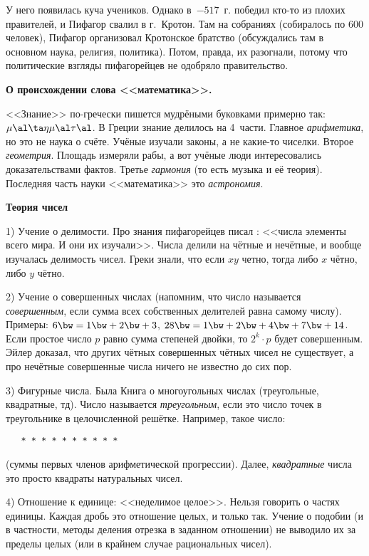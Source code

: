 \documentclass[a4paper,oneside,fleqn,10pt]{article}
\begin{document}
У него появилась куча учеников. Однако в~$-517$~г. победил кто-то из
плохих правителей, и Пифагор свалил в г.~Кротон. Там на собраниях
(собиралось по 600 человек), Пифагор организовал Кротонское братство
(обсуждались там в основном наука, религия, политика). Потом, правда,
их разогнали, потому что политические взгляды пифагорейцев не одобряло
правительство.

\textbf{О происхождении слова <<математика>>.}

<<Знание>> по-гречески пишется мудрёными буковками примерно так:
$\mu\al\ta\eta\mu\al\tau\al$.  В Греции знание делилось на
4~части. Главное \emph{арифметика}, но это не наука о счёте.  Учёные
изучали законы, а не какие-то чиселки. Второе \emph{геометрия}.
Площадь измеряли рабы, а вот учёные люди интересовались
доказательствами фактов.  Третье \emph{гармония} (то есть музыка и её
теория).  Последняя часть науки <<математика>> это \emph{астрономия}.

\textbf{Теория чисел}

1) Учение о делимости. Про знания пифагорейцев писал
: <<числа элементы всего мира. И они их изучали>>.
Числа делили на чётные и нечётные, и вообще изучалась делимость чисел.
Греки знали, что если $xy$ четно, тогда либо $x$ чётно, либо $y$
чётно.

2) Учение о совершенных числах (напомним, что число называется
\emph{совершенным}, если сумма всех собственных делителей равна самому
числу).  Примеры: $6 \bw= 1 \bw+ 2 \bw+ 3$, $28 \bw= 1 \bw+ 2 \bw+ 4
\bw+ 7 \bw+ 14$.  Если простое число $p$ равно сумма степеней двойки,
то $2^k \cdot p$ будет совершенным. 
Эйлер доказал, что других чётных совершенных чётных чисел не
существует, а про нечётные совершенные числа ничего не известно до сих
пор.

3) Фигурные числа. Была Книга о многоугольных числах (треугольные,
квадратные, тд).  Число называется \emph{треугольным}, если это число
точек в треугольнике в целочисленной решётке.  Например, такое число:
\begin{verbatim}
   * * * * * * * * * *
\end{verbatim}
(суммы первых членов арифметической прогрессии).  Далее,
\emph{квадратные} числа это просто квадраты натуральных чисел.

4) Отношение к единице: <<неделимое целое>>. Нельзя говорить о частях
единицы.  Каждая дробь это отношение целых, и только так.  Учение о
подобии (и в частности, методы деления отрезка в заданном отношении)
не выводило их за пределы целых (или в крайнем случае рациональных
чисел).
\end{document}
